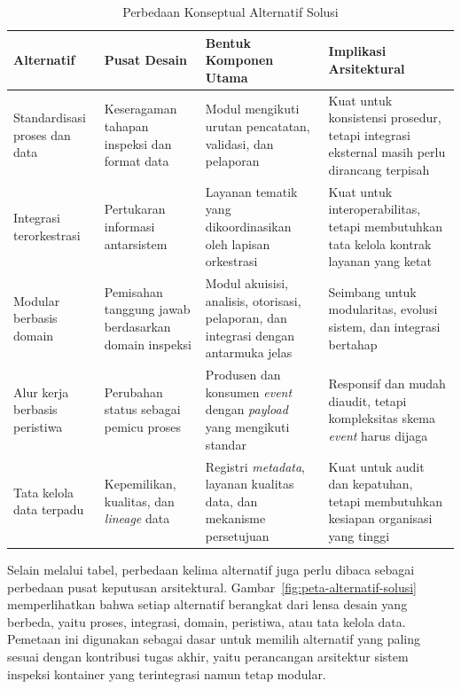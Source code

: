 \begin{table}[ht]
\centering
\scriptsize
\caption{Perbedaan Konseptual Alternatif Solusi}
\label{tbl:perbedaan-konseptual-alternatif}
\setlength{\tabcolsep}{3pt}
\renewcommand{\arraystretch}{1.08}
\begin{tabularx}{\textwidth}{>{\raggedright\arraybackslash}p{} >{\raggedright\arraybackslash}X >{\raggedright\arraybackslash}X >{\raggedright\arraybackslash}X}
\toprule
\textbf{Alternatif} & \textbf{Pusat Desain} & \textbf{Bentuk Komponen Utama} & \textbf{Implikasi Arsitektural} \\
\midrule
Standardisasi proses dan data & Keseragaman tahapan inspeksi dan format data & Modul mengikuti urutan pencatatan, validasi, dan pelaporan & Kuat untuk konsistensi prosedur, tetapi integrasi eksternal masih perlu dirancang terpisah \\
Integrasi terorkestrasi & Pertukaran informasi antarsistem & Layanan tematik yang dikoordinasikan oleh lapisan orkestrasi & Kuat untuk interoperabilitas, tetapi membutuhkan tata kelola kontrak layanan yang ketat \\
Modular berbasis domain & Pemisahan tanggung jawab berdasarkan domain inspeksi & Modul akuisisi, analisis, otorisasi, pelaporan, dan integrasi dengan antarmuka jelas & Seimbang untuk modularitas, evolusi sistem, dan integrasi bertahap \\
Alur kerja berbasis peristiwa & Perubahan status sebagai pemicu proses & Produsen dan konsumen \textit{event} dengan \textit{payload} yang mengikuti standar & Responsif dan mudah diaudit, tetapi kompleksitas skema \textit{event} harus dijaga \\
Tata kelola data terpadu & Kepemilikan, kualitas, dan \textit{lineage} data & Registri \textit{metadata}, layanan kualitas data, dan mekanisme persetujuan & Kuat untuk audit dan kepatuhan, tetapi membutuhkan kesiapan organisasi yang tinggi \\
\bottomrule
\end{tabularx}
\end{table}

\FloatBarrier

Selain melalui tabel, perbedaan kelima alternatif juga perlu dibaca sebagai
perbedaan pusat keputusan arsitektural. Gambar~\ref{fig:peta-alternatif-solusi}
memperlihatkan bahwa setiap alternatif berangkat dari lensa desain yang berbeda,
yaitu proses, integrasi, domain, peristiwa, atau tata kelola data. Pemetaan ini
digunakan sebagai dasar untuk memilih alternatif yang paling sesuai dengan
kontribusi tugas akhir, yaitu perancangan arsitektur sistem inspeksi kontainer
yang terintegrasi namun tetap modular.

